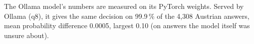 The Ollama model's numbers are measured on its PyTorch weights. Served by Ollama (q8), it gives the same decision on 99.9\,\% of the 4,308 Austrian answers, mean probability difference 0.0005, largest 0.10 (on answers the model itself was unsure about).
